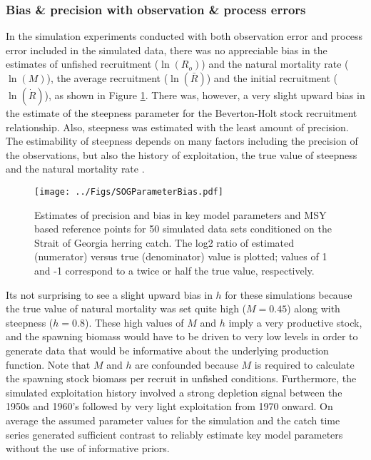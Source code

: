 		\subsubsection{Bias \& precision with observation \& process errors}

In the simulation experiments conducted with both observation error and process error included in the simulated data, there was no appreciable bias in the estimates of unfished recruitment ($\ln(R_o)$) and the natural mortality rate ($\ln(M)$),  the average recruitment ($\ln(\bar{R})$) and the initial recruitment ($\ln(\dot{R})$), as shown in Figure \ref{FigSogBias}.   There was, however, a very slight upward bias in the estimate of the steepness parameter for the Beverton-Holt stock recruitment relationship.  Also, steepness was estimated with the least amount of precision.  The estimability of steepness depends on many factors including the precision of the observations, but also the history of exploitation, the true value of steepness and the natural mortality rate \citep{conn2010can}.
		
\begin{figure}[!tbp]
	\texttt{[image: ../Figs/SOGParameterBias.pdf]}\\
	\caption{Estimates of precision and bias in key model parameters and MSY based reference points for 50 simulated data sets conditioned on the Strait of Georgia herring catch. The log2 ratio of estimated (numerator) versus true (denominator) value is plotted; values of 1 and -1 correspond to a twice or  half the true value, respectively.}\label{FigSogBias}
\end{figure}

Its not surprising to see a slight upward bias in $h$ for these simulations because the true value of natural mortality was set quite high ($M=0.45$) along with steepness ($h=0.8$). These high values of $M$ and $h$ imply a very productive stock, and the spawning biomass would have to be driven to very low levels in order to generate data that would be informative about the underlying production function.  Note that $M$ and $h$ are confounded because $M$ is required to calculate the spawning stock biomass per recruit in unfished conditions. Furthermore, the simulated exploitation history involved a strong depletion signal between the 1950s and 1960's followed by very light exploitation from 1970 onward.  On average the assumed parameter values for the simulation and the catch time series generated sufficient contrast to reliably estimate key model parameters without the use of informative priors.

